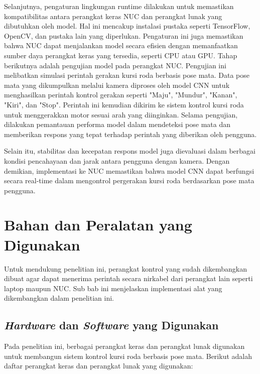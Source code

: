 Selanjutnya, pengaturan lingkungan runtime dilakukan untuk memastikan kompatibilitas antara perangkat keras NUC dan perangkat lunak yang dibutuhkan oleh model. Hal ini mencakup instalasi pustaka seperti TensorFlow, OpenCV, dan pustaka lain yang diperlukan. Pengaturan ini juga memastikan bahwa NUC dapat menjalankan model secara efisien dengan memanfaatkan sumber daya perangkat keras yang tersedia, seperti CPU atau GPU. Tahap berikutnya adalah pengujian model pada perangkat NUC. Pengujian ini melibatkan simulasi perintah gerakan kursi roda berbasis pose mata. Data pose mata yang dikumpulkan melalui kamera diproses oleh model CNN untuk menghasilkan perintah kontrol gerakan seperti "Maju", "Mundur", "Kanan", "Kiri", dan "Stop". Perintah ini kemudian dikirim ke sistem kontrol kursi roda untuk menggerakkan motor sesuai arah yang diinginkan. Selama pengujian, dilakukan pemantauan performa model dalam mendeteksi pose mata dan memberikan respons yang tepat terhadap perintah yang diberikan oleh pengguna.

Selain itu, stabilitas dan kecepatan respons model juga dievaluasi dalam berbagai kondisi pencahayaan dan jarak antara pengguna dengan kamera. Dengan demikian, implementasi ke NUC memastikan bahwa model CNN dapat berfungsi secara real-time dalam mengontrol pergerakan kursi roda berdasarkan pose mata pengguna.

\newpage

\section{Bahan dan Peralatan yang Digunakan}

Untuk mendukung penelitian ini, perangkat kontrol yang sudah dikembangkan dibuat agar dapat menerima perintah secara nirkabel dari perangkat lain seperti laptop maupun NUC. Sub bab ini menjelaskan implementasi alat yang dikembangkan dalam penelitian ini.

\subsection{\emph{Hardware} dan \emph{Software} yang Digunakan}
\label{sec:hardware dan software}

Pada penelitian ini, berbagai perangkat keras dan perangkat lunak digunakan untuk membangun sistem kontrol kursi roda berbasis pose mata. Berikut adalah daftar perangkat keras dan perangkat lunak yang digunakan:

